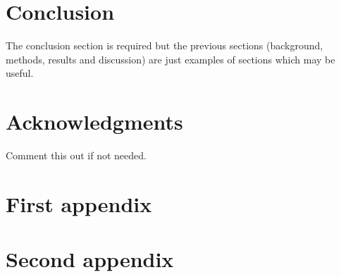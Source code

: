 \documentclass[a4paper,11pt, titlepage]{article}
\theoremstyle{definition}
\theoremstyle{plain}
\theoremstyle{remark}
\begin{document}
\section{Conclusion}
The conclusion section is required but the previous sections (background, methods, results and discussion) are just examples of sections which may be useful. 


\section*{Acknowledgments}
Comment this out if not needed.

\appendix

\section{First appendix}
\label{sec:appendix1}

\section{Second appendix}
\label{sec:appendix2}



\end{document}
